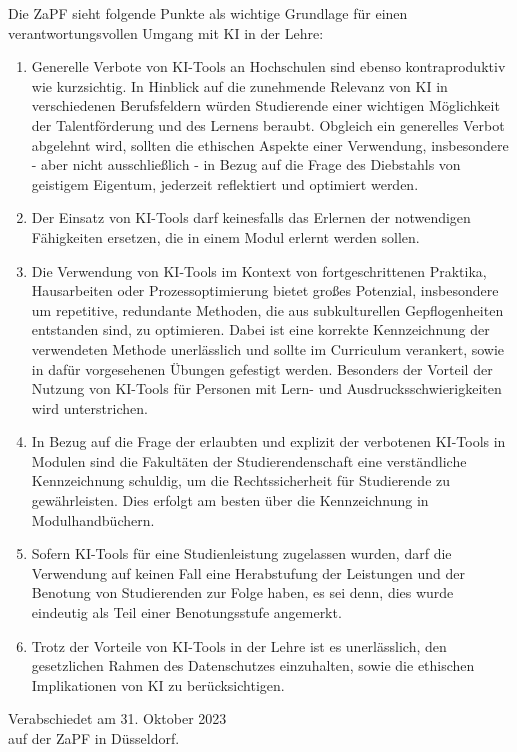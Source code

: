 \documentclass[DIV=calc]{scrartcl}
\begin{document}
Die ZaPF sieht folgende Punkte als wichtige Grundlage für einen verantwortungsvollen Umgang mit KI in der Lehre:
\begin{enumerate}
    \item Generelle Verbote von KI-Tools an Hochschulen sind ebenso kontraproduktiv wie kurzsichtig. In Hinblick auf die zunehmende Relevanz von KI in verschiedenen Berufsfeldern würden Studierende einer wichtigen Möglichkeit der Talentförderung und des Lernens beraubt. Obgleich ein generelles Verbot abgelehnt wird, sollten die ethischen Aspekte einer Verwendung, insbesondere - aber nicht ausschließlich - in Bezug auf die Frage des Diebstahls von geistigem Eigentum, jederzeit reflektiert und optimiert werden.
    \item Der Einsatz von KI-Tools darf keinesfalls das Erlernen der notwendigen Fähigkeiten ersetzen, die in einem Modul erlernt werden sollen.
    \item Die Verwendung von KI-Tools im Kontext von fortgeschrittenen Praktika, Hausarbeiten oder Prozessoptimierung bietet großes Potenzial, insbesondere um repetitive, redundante Methoden, die aus subkulturellen Gepflogenheiten entstanden sind, zu optimieren. Dabei ist eine korrekte Kennzeichnung der verwendeten Methode unerlässlich und sollte im Curriculum verankert, sowie in dafür vorgesehenen Übungen gefestigt werden. Besonders der Vorteil der Nutzung von KI-Tools für Personen mit Lern- und Ausdrucksschwierigkeiten wird unterstrichen.
    \item In Bezug auf die Frage der erlaubten und explizit der verbotenen KI-Tools in Modulen sind die Fakultäten der Studierendenschaft eine verständliche Kennzeichnung schuldig, um die Rechtssicherheit für Studierende zu gewährleisten. Dies erfolgt am besten über die Kennzeichnung in Modulhandbüchern.\newpage
    \item Sofern KI-Tools für eine Studienleistung zugelassen wurden, darf die Verwendung auf keinen Fall eine Herabstufung der Leistungen und der Benotung von Studierenden zur Folge haben, es sei denn, dies wurde eindeutig als Teil einer Benotungsstufe angemerkt.
    \item Trotz der Vorteile von KI-Tools in der Lehre ist es unerlässlich, den gesetzlichen Rahmen des Datenschutzes einzuhalten, sowie die ethischen Implikationen von KI zu berücksichtigen.
\end{enumerate}


%
\vfill
\begin{flushright}
	Verabschiedet am 31. Oktober 2023 \\
	auf der ZaPF in Düsseldorf.
\end{flushright}
\end{document}
